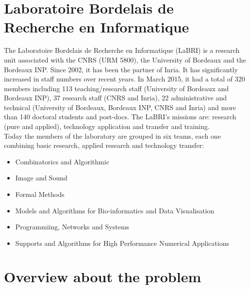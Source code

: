 \section{Laboratoire Bordelais de Recherche en Informatique}
The Laboratoire Bordelais de Recherche en Informatique (LaBRI) is a research unit associated with the CNRS (URM 5800), the University of Bordeaux and the Bordeaux INP. Since 2002, it has been the partner of Inria. It has significantly increased in staff numbers over recent years. In March 2015, it had a total of 320 members including 113 teaching/research staff (University of Bordeaux and Bordeaux INP), 37 research staff (CNRS and Inria), 22 administrative and technical (University of Bordeaux, Bordeaux INP, CNRS and Inria) and more than 140 doctoral students and post-docs. The LaBRI's missions are: research (pure and applied), technology application and transfer and training.\\
Today the members of the laboratory are grouped in six teams, each one combining basic research, applied research and technology transfer:
\begin{itemize}
\item Combinatorics and Algorithmic
\item Image and Sound
\item Formal Methods
\item Models and Algorithms for Bio-informatics and Data Visualisation
\item Programmiing, Networks and Systems
\item Supports and Algorithms for High Performance Numerical Applications
\end{itemize}

\section{Overview about the problem}






























